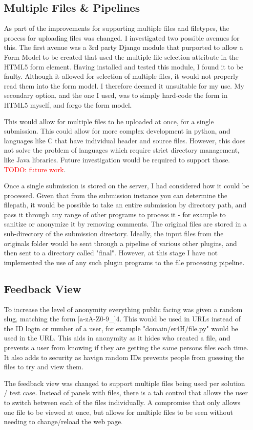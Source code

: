 \documentclass[a4paper,11pt]{report}
\newcommand{\todo}[1]{\textcolor{red}{TODO: #1}}
\begin{document}
\subsection{Multiple Files \& Pipelines}
As part of the improvements for supporting multiple files and filetypes, the process for uploading  files was changed. I investigated two possible avenues for this. The first avenue was a 3rd party Django module that purported to allow a Form Model to be created that used the multiple file selection attribute in the HTML5 form element. Having installed and tested this module, I found it to be faulty. Although it allowed for selection of multiple files, it would not properly read them into the form model. I therefore deemed it unsuitable for my use. My secondary option, and the one I used, was to simply hard-code the form in HTML5 myself, and forgo the form model.\par
This would allow for multiple files to be uploaded at once, for a single submission. This could allow for more complex development in python, and languages like C that have individual header and source files. However, this does not solve the problem of languages which require strict directory management, like Java libraries. Future investigation would be required to support those. \todo{future work}.\par
Once a single submission is stored on the server, I had considered how it could be processed. Given that from the submission instance you can determine the filepath, it would be possible to take an entire submission by directory path, and pass it through any range of other programs to process it - for example to sanitize or anonymize it by removing comments. The original files are stored in a sub-directory of the submission directory. Ideally, the input files from the originals folder would be sent through a pipeline of various other plugins, and then sent to a directory called "final". However, at this stage I have not implemented the use of any such plugin programs to the file processing pipeline.\par
\subsection{Feedback View}
To increase the level of anonymity everything public facing was given a random slug, matching the form [a-zA-Z0-9\-\_]{4}. This would be used in URLs instead of the ID login or number of a user, for example "domain/er4H/file.py" would be used in the URL. This aids in anonymity as it hides who created a file, and prevents a user from knowing if they are getting the same persons files each time. It also adds to security as havign random IDs prevents people from guessing the files to try and view them.\par
The feedback view was changed to support multiple files being used per solution / test case. Instead of panels with files, there is a tab control that allows the user to switch between each of the files individually. A compromise that only allows one file to be viewed at once, but allows for multiple files to be seen without needing to change/reload the web page.\par
\end{document}
